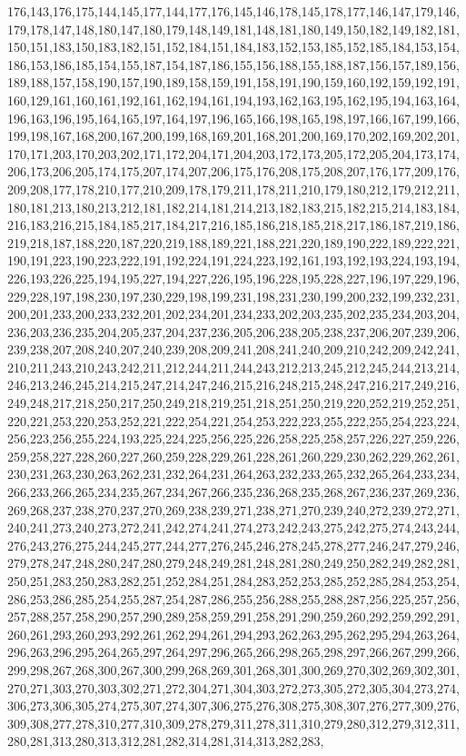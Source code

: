 176,143,176,175,144,145,177,144,177,176,145,146,178,145,178,177,146,147,179,146,179,178,147,148,180,147,180,179,148,149,181,148,181,180,149,150,182,149,182,181,150,151,183,150,183,182,151,152,184,151,184,183,152,153,185,152,185,184,153,154,186,153,186,185,154,155,187,154,187,186,155,156,188,155,188,187,156,157,189,156,189,188,157,158,190,157,190,189,158,159,191,158,191,190,159,160,192,159,192,191,160,129,161,160,161,192,161,162,194,161,194,193,162,163,195,162,195,194,163,164,196,163,196,195,164,165,197,164,197,196,165,166,198,165,198,197,166,167,199,166,199,198,167,168,200,167,200,199,168,169,201,168,201,200,169,170,202,169,202,201,170,171,203,170,203,202,171,172,204,171,204,203,172,173,205,172,205,204,173,174,206,173,206,205,174,175,207,174,207,206,175,176,208,175,208,207,176,177,209,176,209,208,177,178,210,177,210,209,178,179,211,178,211,210,179,180,212,179,212,211,180,181,213,180,213,212,181,182,214,181,214,213,182,183,215,182,215,214,183,184,216,183,216,215,184,185,217,184,217,216,185,186,218,185,218,217,186,187,219,186,219,218,187,188,220,187,220,219,188,189,221,188,221,220,189,190,222,189,222,221,190,191,223,190,223,222,191,192,224,191,224,223,192,161,193,192,193,224,193,194,226,193,226,225,194,195,227,194,227,226,195,196,228,195,228,227,196,197,229,196,229,228,197,198,230,197,230,229,198,199,231,198,231,230,199,200,232,199,232,231,200,201,233,200,233,232,201,202,234,201,234,233,202,203,235,202,235,234,203,204,236,203,236,235,204,205,237,204,237,236,205,206,238,205,238,237,206,207,239,206,239,238,207,208,240,207,240,239,208,209,241,208,241,240,209,210,242,209,242,241,210,211,243,210,243,242,211,212,244,211,244,243,212,213,245,212,245,244,213,214,246,213,246,245,214,215,247,214,247,246,215,216,248,215,248,247,216,217,249,216,249,248,217,218,250,217,250,249,218,219,251,218,251,250,219,220,252,219,252,251,220,221,253,220,253,252,221,222,254,221,254,253,222,223,255,222,255,254,223,224,256,223,256,255,224,193,225,224,225,256,225,226,258,225,258,257,226,227,259,226,259,258,227,228,260,227,260,259,228,229,261,228,261,260,229,230,262,229,262,261,230,231,263,230,263,262,231,232,264,231,264,263,232,233,265,232,265,264,233,234,266,233,266,265,234,235,267,234,267,266,235,236,268,235,268,267,236,237,269,236,269,268,237,238,270,237,270,269,238,239,271,238,271,270,239,240,272,239,272,271,240,241,273,240,273,272,241,242,274,241,274,273,242,243,275,242,275,274,243,244,276,243,276,275,244,245,277,244,277,276,245,246,278,245,278,277,246,247,279,246,279,278,247,248,280,247,280,279,248,249,281,248,281,280,249,250,282,249,282,281,250,251,283,250,283,282,251,252,284,251,284,283,252,253,285,252,285,284,253,254,286,253,286,285,254,255,287,254,287,286,255,256,288,255,288,287,256,225,257,256,257,288,257,258,290,257,290,289,258,259,291,258,291,290,259,260,292,259,292,291,260,261,293,260,293,292,261,262,294,261,294,293,262,263,295,262,295,294,263,264,296,263,296,295,264,265,297,264,297,296,265,266,298,265,298,297,266,267,299,266,299,298,267,268,300,267,300,299,268,269,301,268,301,300,269,270,302,269,302,301,270,271,303,270,303,302,271,272,304,271,304,303,272,273,305,272,305,304,273,274,306,273,306,305,274,275,307,274,307,306,275,276,308,275,308,307,276,277,309,276,309,308,277,278,310,277,310,309,278,279,311,278,311,310,279,280,312,279,312,311,280,281,313,280,313,312,281,282,314,281,314,313,282,283,